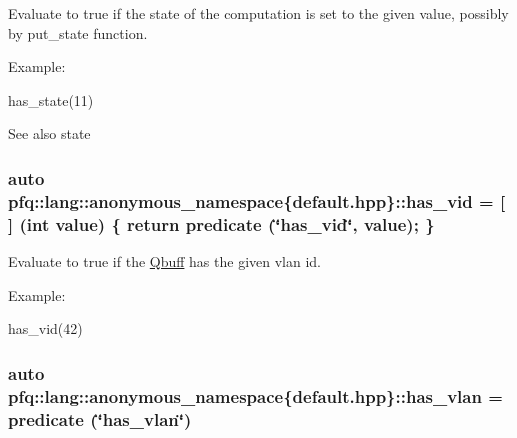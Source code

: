 Evaluate to {\ttfamily true} if the state of the computation is set to the given {\ttfamily value}, possibly by put\+\_\+state function. 

Example\+:

has\+\_\+state(11)

\begin{DoxySeeAlso}{See also}
state 
\end{DoxySeeAlso}
\subsubsection[{\texorpdfstring{has\+\_\+vid}{has_vid}}]{\setlength{\rightskip}{0pt plus 5cm}auto pfq\+::lang\+::anonymous\+\_\+namespace\{default.\+hpp\}\+::has\+\_\+vid = \mbox{[}$\,$\mbox{]} (int value) \{ return {\bf predicate} (\char`\"{}has\+\_\+vid\char`\"{}, value); \}}\hypertarget{namespacepfq_1_1lang_1_1anonymous__namespace_02default_8hpp_03_a99c204d8095fdccd50d4cb24d32e5b5b}{}\label{namespacepfq_1_1lang_1_1anonymous__namespace_02default_8hpp_03_a99c204d8095fdccd50d4cb24d32e5b5b}


Evaluate to {\ttfamily true} if the \hyperlink{structpfq_1_1lang_1_1Qbuff}{Qbuff} has the given vlan id. 

Example\+:

has\+\_\+vid(42) 
\subsubsection[{\texorpdfstring{has\+\_\+vlan}{has_vlan}}]{\setlength{\rightskip}{0pt plus 5cm}auto pfq\+::lang\+::anonymous\+\_\+namespace\{default.\+hpp\}\+::has\+\_\+vlan = {\bf predicate} (\char`\"{}has\+\_\+vlan\char`\"{})}\hypertarget{namespacepfq_1_1lang_1_1anonymous__namespace_02default_8hpp_03_a1f0378ddfa90777d11ffae5fbb57b4e0}{}\label{namespacepfq_1_1lang_1_1anonymous__namespace_02default_8hpp_03_a1f0378ddfa90777d11ffae5fbb57b4e0}



